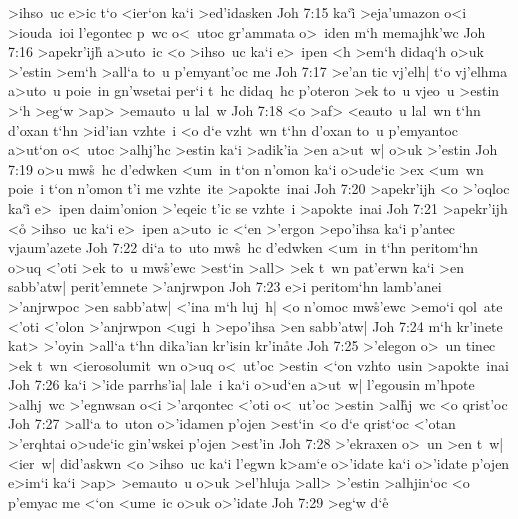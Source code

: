 >ihso~uc
e>ic
t`o
<ier`on
ka`i
>ed'idasken\bibvsend
\vs Joh 7:15
ka`i\r{}
>eja'umazon
o<i
>iouda~ioi
l'egontec
p~wc
o<~utoc
gr'ammata
o>~iden
m`h
memajhk'wc\bibvsend
\vs Joh 7:16
>apekr'ij\r{h}
a>uto~ic
<o
>ihso~uc
ka`i
e>~ipen
<h
>em`h
didaq`h
o>uk
>'estin
>em`h
>all`a
to~u
p'emyant'oc
me\bibvsend
\vs Joh 7:17
>e'an
tic
vj'elh|
t`o
vj'elhma
a>uto~u
poie~in
gn'wsetai
per`i
t~hc
didaq~hc
p'oteron
>ek
to~u
vjeo~u
>estin
>`h
>eg`w
>ap>
>emauto~u
lal~w\bibvsend
\vs Joh 7:18
<o
>af>
<eauto~u
lal~wn
t`hn
d'oxan
t`hn
>id'ian
vzhte~i
<o
d`e
vzht~wn
t`hn
d'oxan
to~u
p'emyantoc
a>ut`on
o<~utoc
>alhj'hc
>estin
ka`i
>adik'ia
>en
a>ut~w|
o>uk
>'estin\bibvsend
\vs Joh 7:19
o>u
mw\r{s}~hc
d'edwken
<um~in
t`on
n'omon
ka`i
o>ude`ic
>ex
<um~wn
poie~i
t`on
n'omon
t'i
me
vzhte~ite
>apokte~inai\bibvsend
\vs Joh 7:20
>apekr'ijh
<o
>'oqloc
ka`i\r{}
e>~ipen
daim'onion
>'eqeic
t'ic
se
vzhte~i
>apokte~inai\bibvsend
\vs Joh 7:21
>apekr'ijh
<o\r{}
>ihso~uc
ka`i
e>~ipen
a>uto~ic
<`en
>'ergon
>epo'ihsa
ka`i
p'antec
vjaum'azete\bibvsend
\vs Joh 7:22
di`a
to~uto
mw\r{s}~hc
d'edwken
<um~in
t`hn
peritom`hn
o>uq
<'oti
>ek
to~u
mw\r{s}'ewc
>est`in
>all>
>ek
t~wn
pat'erwn
ka`i
>en
sabb'atw|
perit'emnete
>'anjrwpon\bibvsend
\vs Joh 7:23
e>i
peritom`hn
lamb'anei
>'anjrwpoc
>en
sabb'atw|
<'ina
m`h
luj~h|
<o
n'omoc
mw\r{s}'ewc
>emo`i
qol~ate
<'oti
<'olon
>'anjrwpon
<ugi~h
>epo'ihsa
>en
sabb'atw|\bibvsend
\vs Joh 7:24
m`h
kr'inete
kat>
>'oyin
>all`a
t`hn
dika'ian
kr'isin
kr'in\r{a}te\bibvsend
{}
\vs Joh 7:25
>'elegon
o>~un
tinec
>ek
t~wn
<ierosolumit~wn
o>uq
o<~ut'oc
>estin
<`on
vzhto~usin
>apokte~inai\bibvsend
\vs Joh 7:26
ka`i
>'ide
parrhs'ia|
lale~i
ka`i
o>ud`en
a>ut~w|
l'egousin
m'hpote
>alhj~wc
>'egnwsan
o<i
>'arqontec
<'oti
o<~ut'oc
>estin
>al\r{h}j~wc
<o
qrist'oc\bibvsend
\vs Joh 7:27
>all`a
to~uton
o>'idamen
p'ojen
>est`in
<o
d`e
qrist`oc
<'otan
>'erqhtai
o>ude`ic
gin'wskei
p'ojen
>est'in\bibvsend
\vs Joh 7:28
>'ekraxen
o>~un
>en
t~w|
<ier~w|
did'askwn
<o
>ihso~uc
ka`i
l'egwn
k>am`e
o>'idate
ka`i
o>'idate
p'ojen
e>im`i
ka`i
>ap>
>emauto~u
o>uk
>el'hluja
>all>
>'estin
>alhjin`oc
<o
p'emyac
me
<`on
<ume~ic
o>uk
o>'idate\bibvsend
\vs Joh 7:29
>eg`w
d`e\r{}
